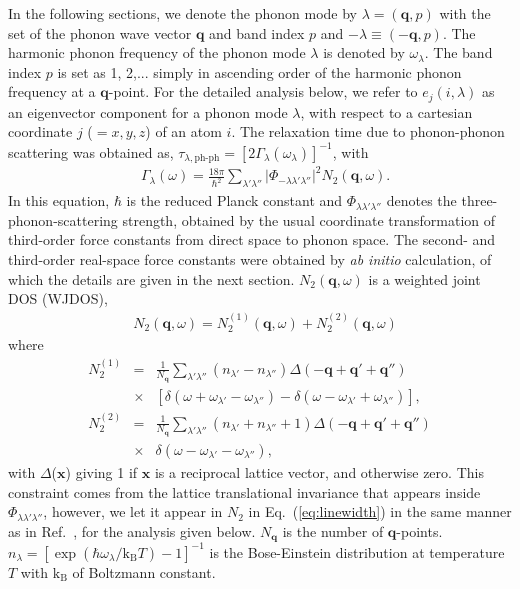 \documentclass[twocolumn,amsmath,amssymb,a4paper,prb,superscriptaddress,floatfix]{revtex4-1}
\begin{document}
In the following sections, we denote the phonon mode by $\lambda=(\mathbf{q},p)$
with the set of the phonon wave vector $\mathbf{q}$ and band index $p$ and
$-\lambda \equiv (-\mathbf{q},p)$.  The harmonic phonon frequency of the phonon
mode $\lambda$ is denoted by  $\omega_\lambda$.  The band index $p$ is set as 1,
2,... simply in ascending order of the harmonic phonon frequency at a
$\mathbf{q}$-point. For the detailed analysis below, we refer to $e_{j}(i,\lambda)$ as an eigenvector
component for a phonon mode $\lambda$, with respect to a cartesian coordinate
$j$ ($=x,y,z$) of an atom $i$.  The relaxation time due to phonon-phonon scattering
was obtained as,
$\tau_{\lambda,\text{ph-ph}}=[2\Gamma_\lambda(\omega_\lambda)]^{-1}$, with
\begin{align}
 \label{eq:linewidth}
 &\Gamma_\lambda(\omega) = \frac{18\pi}{\hbar^2}
  \sum_{\lambda' \lambda''}
  \bigl|\Phi_{-\lambda\lambda'\lambda''}\bigl|^2 N_2(\mathbf{q},\omega).
\end{align}
In this equation, $\hbar$ is the reduced Planck constant and
$\Phi_{\lambda\lambda'\lambda''}$ denotes the three-phonon-scattering strength,
obtained by the usual coordinate transformation of third-order force constants
from direct space to phonon space.\cite{phono3py} The second- and third-order
real-space force constants were obtained by {\it ab initio} calculation, of
which the details are given in the next section. $N_2(\mathbf{q},\omega)$ is a
weighted joint DOS (WJDOS)\cite{phono3py},
\begin{align}
 \label{eq:jdos}
 &N_2(\mathbf{q},\omega) = N_2^{(1)}(\mathbf{q},\omega) +  N_2^{(2)}(\mathbf{q},\omega)
\end{align}
where
\begin{eqnarray*}
        N_2^{(1)} & = & \frac{1}{N_\mathbf{q}} \sum_{\lambda'\lambda''}(n_{\lambda'}-n_{\lambda''})\Delta(-\mathbf{q} + \mathbf{q'} + \mathbf{q''}) \nonumber \\
                                                                   & \times & [\delta(\omega + \omega_{\lambda'} - \omega_{\lambda''}) - \delta(\omega - \omega_{\lambda'} + \omega_{\lambda''})],\\
        N_2^{(2)} & = & \frac{1}{N_\mathbf{q}} \sum_{\lambda'\lambda''}(n_{\lambda'} + n_{\lambda''}+1)\Delta(-\mathbf{q} + \mathbf{q'} + \mathbf{q''}) \nonumber \\
                                                                   & \times & \delta(\omega - \omega_{\lambda'} - \omega_{\lambda''}),
\end{eqnarray*}
with $\Delta$($\mathbf{x}$) giving 1 if $\mathbf{x}$ is a reciprocal lattice
vector, and otherwise zero. This constraint comes from the lattice
translational invariance that appears inside
$\Phi_{\lambda\lambda'\lambda''}$,\cite{phono3py} however, we let it appear in
$N_2$ in Eq.~(\ref{eq:linewidth}) in the same manner as in
Ref.~, for the analysis given below. $N_\mathbf{q}$
is the number of $\mathbf{q}$-points.
$n_\lambda=[\exp(\hbar\omega_\lambda/\mathrm{k_B}T)-1]^{-1}$ is
the Bose-Einstein distribution at temperature $T$ with $\mathrm{k_B}$ of Boltzmann constant.
\end{document}
